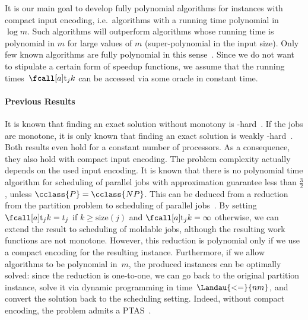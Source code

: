 It is our main goal to develop fully polynomial algorithms for instances with compact input encoding,
i.e.~algorithms with a running time polynomial in~$\log m$.
Such algorithms will outperform algorithms whose running time is polynomial in $m$
for large values of $m$ (super-polynomial in the input size).
Only few known algorithms are fully polynomial in this sense~\cite{mounie99,sanders11,jansen13a}.
Since we do not want to stipulate a certain form of speedup functions,
we assume that the running times~$\ptm{j}{k}$ can be accessed via some oracle in constant time.


\paragraph*{Previous Results}

It is known that finding an exact solution without monotony is -hard~\cite{du89}.
If the jobs are monotone,
it is only known that finding an exact solution is weakly -hard~\cite{jansen13c}.
Both results even hold for a constant number of processors.
As a consequence, they also hold with compact input encoding.
The problem complexity actually depends on the used input encoding.
It is known that there is no polynomial time algorithm for scheduling of parallel jobs
with approximation guarantee less than $\frac{3}{2}$,
unless $\cclass{P} = \cclass{NP}$.
This can be deduced from a reduction from the partition problem to scheduling of parallel jobs~\cite{drozdowski95}.
By setting
$\ptm{j}{k} = t_j$ if $k \geq \mathrm{size}(j)$ and $\ptm{j}{k} = \infty$ otherwise,
we can extend the result to scheduling of moldable jobs,
although the resulting work functions are not monotone.
However, this reduction is polynomial only if we use a compact encoding for the resulting instance.
Furthermore, if we allow algorithms to be polynomial in~$m$,
the produced instances can be optimally solved:
since the reduction is one-to-one, we can go back to the original partition instance,
solve it via dynamic programming in time~$\Landau{<=}{nm}$,
and convert the solution back to the scheduling setting.
Indeed, without compact encoding, the problem admits a PTAS~\cite{jansen10}.


